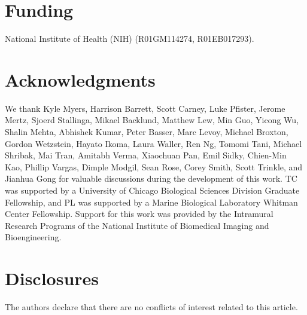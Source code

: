 \documentclass[]{osa-article}
\begin{document}
\section*{Funding}
National Institute of Health (NIH) (R01GM114274, R01EB017293).

\section*{Acknowledgments}
We thank Kyle Myers, Harrison Barrett, Scott Carney, Luke Pfister, Jerome Mertz,
Sjoerd Stallinga, Mikael Backlund, Matthew Lew, Min Guo, Yicong Wu, Shalin
Mehta, Abhishek Kumar, Peter Basser, Marc Levoy, Michael Broxton, Gordon
Wetzstein, Hayato Ikoma, Laura Waller, Ren Ng, Tomomi Tani, Michael Shribak, Mai
Tran, Amitabh Verma, Xiaochuan Pan, Emil Sidky, Chien-Min Kao, Phillip Vargas,
Dimple Modgil, Sean Rose, Corey Smith, Scott Trinkle, and Jianhua Gong for
valuable discussions during the development of this work. TC was supported by a
University of Chicago Biological Sciences Division Graduate Fellowship, and PL
was supported by a Marine Biological Laboratory Whitman Center Fellowship.
Support for this work was provided by the Intramural Research Programs of the
National Institute of Biomedical Imaging and Bioengineering.

\section*{Disclosures}
The authors declare that there are no conflicts of interest related to this article.


\appendix
\end{document}
